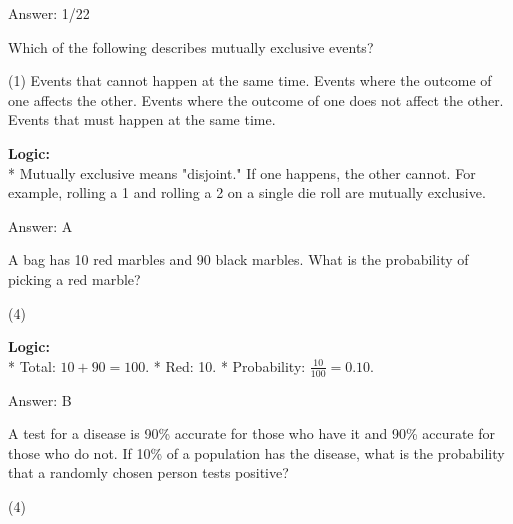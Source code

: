 \documentclass[11pt,paper=a4,answers]{exam}
\begin{document}
\begin{questions}
\begin{solution}
\vspace{30pt}

Answer: \colorbox{yellow!100}{1/22}
\end{solution}

\vspace{60pt}

\question
Which of the following describes mutually exclusive events?
\begin{tasks}(1)
    \task Events that cannot happen at the same time.
    \task Events where the outcome of one affects the other.
    \task Events where the outcome of one does not affect the other.
    \task Events that must happen at the same time.
\end{tasks}

\begin{solution}
\textbf{Logic:} \\
* Mutually exclusive means "disjoint." If one happens, the other cannot. For example, rolling a 1 and rolling a 2 on a single die roll are mutually exclusive.

\vspace{30pt}

Answer: \colorbox{yellow!100}{A}
\end{solution}

\vspace{60pt}

\question
A bag has 10 red marbles and 90 black marbles. What is the probability of picking a red marble?
\begin{tasks}(4)
\end{tasks}

\begin{solution}
\textbf{Logic:} \\
* Total: $10 + 90 = 100$.
* Red: 10.
* Probability: $\frac{10}{100} = 0.10$.

\vspace{30pt}

Answer: \colorbox{yellow!100}{B}
\end{solution}

\vspace{60pt}

\question
A test for a disease is 90\% accurate for those who have it and 90\% accurate for those who do not. If 10\% of a population has the disease, what is the probability that a randomly chosen person tests positive?
\begin{tasks}(4)
\end{tasks}


\end{questions}
\end{document}
